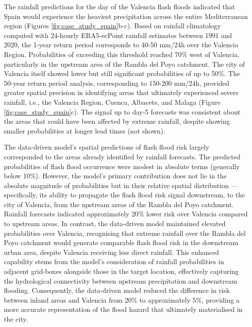 The  rainfall predictions for the day of the Valencia flash floods indicated that Spain would experience the heaviest precipitation across the entire Mediterranean region (Figures \ref{fig:case_study_spain}b-c). Based on rainfall climatology computed with 24-hourly ERA5-ecPoint rainfall estimates between 1991 and 2020, the 1-year return period corresponds to 40-50 mm/24h over the Valencia Region. Probabilities of exceeding this threshold reached 70\% west of Valencia, particularly in the upstream area of the Rambla del Poyo catchment. The city of Valencia itself showed lower but still significant probabilities of up to 50\%. The 50-year return period analysis, corresponding to 150-200 mm/24h, provided greater spatial precision in identifying areas that ultimately experienced severe rainfall, i.e., the Valencia Region, Cuenca, Albacete, and Malaga (Figure \ref{fig:case_study_spain}c). The signal up to day-5 forecasts was consistent about the areas that could have been affected by extreme rainfall, despite showing smaller probabilities at longer lead times (not shown).

The   data-driven model's spatial predictions of flash flood risk largely corresponded to the areas already identified by rainfall forecasts. The predicted probabilities of flash flood occurrence were modest in absolute terms (generally below 10\%). However, the model's primary contribution does not lie in the absolute magnitude of probabilities but in their relative spatial distribution — specifically, its ability to propagate the flash flood risk signal downstream, to the city of Valencia, from the upstream areas of the Rambla del Poyo catchment. Rainfall forecasts indicated approximately 20\% lower risk over Valencia compared to upstream areas. In contrast, the data-driven model maintained elevated probabilities over Valencia, recognising that extreme rainfall over the Rambla del Poyo catchment would generate comparable flash flood risk in the downstream urban area, despite Valencia receiving less direct rainfall. This enhanced capability stems from the model's consideration of rainfall probabilities in adjacent grid-boxes alongside those in the target location, effectively capturing the hydrological connectivity between upstream precipitation and downstream flooding. Consequently, the data-driven model reduced the difference in risk between inland areas and Valencia from 20\% to approximately 5\%, providing a more accurate representation of the flood hazard that ultimately materialised in the city.


